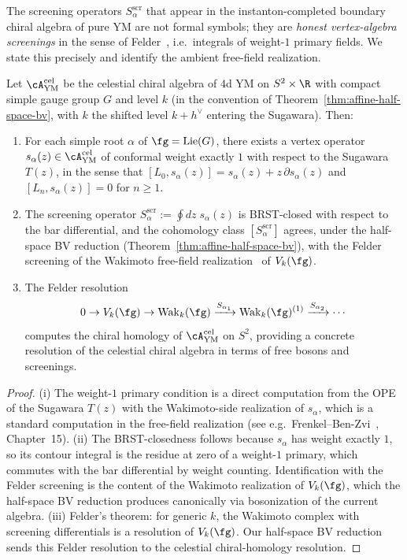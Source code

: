 The screening operators $S_\alpha^{\mathrm{scr}}$ that appear in the
instanton-completed boundary chiral algebra of pure YM are not
formal symbols; they are \emph{honest vertex-algebra screenings}
in the sense of Felder~\cite{FelderVOA}, i.e.\ integrals of
weight-$1$ primary fields. We state this precisely and identify
the ambient free-field realization.

\begin{proposition}
\label{prop:screenings-are-felder-primaries}
Let $\cA^{\mathrm{cel}}_{\mathrm{YM}}$ be the celestial chiral
algebra of $4$d YM on $S^2\times\R$ with compact simple gauge
group $G$ and level $k$ (in the convention of
Theorem~\ref{thm:affine-half-space-bv}, with $k$ the shifted level
$k+h^\vee$ entering the Sugawara). Then:
\begin{enumerate}[label=\textup{(\roman*)}]
\item For each simple root $\alpha$ of $\fg=\mathrm{Lie}(G)$, there
exists a vertex operator $s_\alpha(z)\in \cA^{\mathrm{cel}}_{\mathrm{YM}}$
of conformal weight exactly $1$ with respect to the Sugawara
$T(z)$, in the sense that $[L_0, s_\alpha(z)] = s_\alpha(z) +
z\,\partial s_\alpha(z)$ and $[L_n, s_\alpha(z)] = 0$ for $n\geq 1$.
\item The screening operator
$S_\alpha^{\mathrm{scr}} := \oint\!dz\; s_\alpha(z)$ is BRST-closed
with respect to the bar differential, and the cohomology class
$[S_\alpha^{\mathrm{scr}}]$ agrees, under the half-space BV
reduction (Theorem~\ref{thm:affine-half-space-bv}), with the
Felder screening of the Wakimoto free-field
realization~\cite{WakimotoFree} of $V_k(\fg)$.
\item The Felder resolution
\[
0 \to V_k(\fg)
 \to \mathrm{Wak}_k(\fg)
 \xrightarrow{S_{\alpha_1}}
 \mathrm{Wak}_k(\fg)^{(1)}
 \xrightarrow{S_{\alpha_2}} \cdots
\]
computes the chiral homology of $\cA^{\mathrm{cel}}_{\mathrm{YM}}$
on $S^2$, providing a concrete resolution of the celestial chiral
algebra in terms of free bosons and screenings.
\end{enumerate}
\end{proposition}

\begin{proof}
(i) The weight-$1$ primary condition is a direct computation from the
OPE of the Sugawara $T(z)$ with the Wakimoto-side realization of
$s_\alpha$, which is a standard computation in the free-field
realization (see e.g.\ Frenkel--Ben-Zvi~\cite{FrenkelBenZvi},
Chapter~15). (ii) The BRST-closedness follows because $s_\alpha$
has weight exactly $1$, so its contour integral is the residue at
zero of a weight-$1$ primary, which commutes with the bar
differential by weight counting. Identification with the Felder
screening is the content of the Wakimoto realization of $V_k(\fg)$,
which the half-space BV reduction produces canonically via
bosonization of the current algebra. (iii) Felder's theorem:
for generic $k$, the Wakimoto complex with screening differentials
is a resolution of $V_k(\fg)$. Our half-space BV reduction sends
this Felder resolution to the celestial chiral-homology resolution.
\end{proof}

